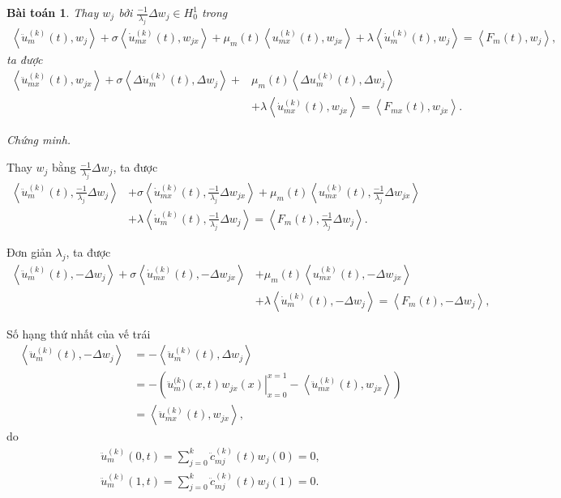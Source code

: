 \documentclass[12pt,a4paper]{article}
\newtheorem{theorem}{Bài toán}[section]
\theoremstyle{definition}
\begin{document}
\begin{theorem}
Thay $w_j$ bởi $\frac{-1}{\lambda_j} \Delta w_j \in H^1_0$ trong
\begin{align*}
    \left<\ddot{u}_m^{(k)}(t), w_j\right>
    + \sigma \left<\dot{u}_{mx}^{(k)}(t), w_{jx}\right>
    + \mu_m(t) \left<u_{mx}^{(k)}(t), w_{jx}\right>
    + \lambda \left<\dot{u}_m^{(k)}(t), w_j\right>
    = \left<F_m(t), w_j\right>,
\end{align*}
ta được
\begin{align*}
    \left<\ddot{u}_{mx}^{(k)}(t), w_{jx}\right>
    + \sigma \left< \Delta \dot{u}_m^{(k)}(t), \Delta w_j\right>
    + &\mu_m(t) \left<\Delta u_m^{(k)}(t), \Delta w_j\right> \\
    &+ \lambda \left<\dot{u}_{mx}^{(k)}(t), w_{jx}\right>
    = \left<F_{mx}(t), w_{jx}\right>.
\end{align*}
\end{theorem}

\textit{Chứng minh.}

Thay $w_j$ bằng $\frac{-1}{\lambda_j}\Delta w_j$, ta được
\begin{align*}
    \left<\ddot{u}_m^{(k)}(t), \frac{-1}{\lambda_j}\Delta w_j\right>
    &+ \sigma \left<\dot{u}_{mx}^{(k)}(t), \frac{-1}{\lambda_j}\Delta w_{jx}\right>
    + \mu_m(t) \left<u_{mx}^{(k)}(t), \frac{-1}{\lambda_j}\Delta w_{jx}\right> \\
    &+ \lambda \left<\dot{u}_m^{(k)}(t), \frac{-1}{\lambda_j}\Delta w_j\right>
    = \left<F_m(t), \frac{-1}{\lambda_j}\Delta w_j\right>.
\end{align*}

Đơn giản $\lambda_j$, ta được
\begin{align*}
    \left<\ddot{u}_m^{(k)}(t), -\Delta w_j\right>
    + \sigma \left<\dot{u}_{mx}^{(k)}(t), -\Delta w_{jx}\right>
    &+ \mu_m(t) \left<u_{mx}^{(k)}(t), -\Delta w_{jx}\right> \\
    &+ \lambda \left<\dot{u}_m^{(k)}(t), -\Delta w_j\right>
    = \left<F_m(t), -\Delta w_j\right>,
\end{align*}

Số hạng thứ nhất của vế trái
\begin{align*}
    \left<\ddot{u}_m^{(k)}(t), -\Delta w_j\right>
    &= - \left<\ddot{u}_m^{(k)}(t), \Delta w_j\right> \\
    &= - \left(\left.\ddot{u}_m^{(k})(x,t) w_{jx}(x)\right|_{x=0}^{x=1} -\left<\ddot{u}_{mx}^{(k)}(t), w_{jx}\right>\right) \\
    &= \left<\ddot{u}_{mx}^{(k)}(t), w_{jx}\right>,
\end{align*}
do
\begin{align*}
    \ddot{u}_m^{(k)}(0,t) = \sum_{j=0}^k \ddot{c}_{mj}^{(k)}(t) w_j(0) = 0, \\
    \ddot{u}_m^{(k)}(1,t) = \sum_{j=0}^k \ddot{c}_{mj}^{(k)}(t) w_j(1) = 0.
\end{align*}
\end{document}
